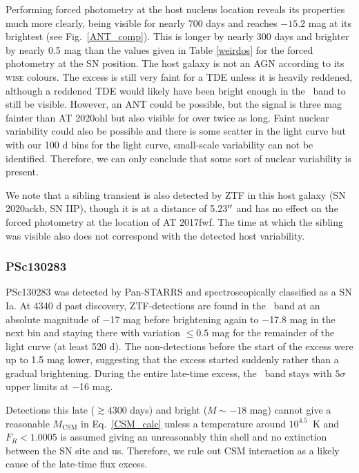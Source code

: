 \documentclass[a4paper,oneside,12pt, class=Latex/Classes/PhDthesisPSnPDF, crop=false]{standalone}
\begin{document}
Performing forced photometry at the host nucleus location reveals its properties much more clearly, being visible for nearly 700 days and reaches $-15.2$ mag at its brightest (see Fig.~\ref{ANT_comp}). This is longer by nearly 300 days and brighter by nearly 0.5 mag than the values given in Table \ref{weirdos} for the forced photometry at the SN position. The host galaxy is not an AGN according to its \textsc{wise} colours. The excess is still very faint for a TDE unless it is heavily reddened, although a reddened TDE would likely have been bright enough in the \ztfi\ band to still be visible. However, an ANT could be possible, but the signal is three mag fainter than AT 2020ohl but also visible for over twice as long. Faint nuclear variability could also be possible and there is some scatter in the light curve but with our 100 d bins for the light curve, small-scale variability can not be identified. Therefore, we can only conclude that some sort of nuclear variability is present. 

We note that a sibling transient is also detected by ZTF in this host galaxy (SN 2020ackb, SN IIP), though it is at a distance of 5.23$^{\prime\prime}$ and has no effect on the forced photometry at the location of AT 2017fwf. The time at which the sibling was visible also does not correspond with the detected host variability.


\subsubsection*{PSc130283}
PSc130283 was detected by Pan-STARRS and spectroscopically classified as a SN Ia. At 4340 d past discovery, ZTF-detections are found in the \ztfr\ band at an absolute magnitude of $-$17 mag before brightening again to $-$17.8 mag in the next bin and staying there with variation $\leq 0.5$ mag for the remainder of the light curve (at least 520 d). The non-detections before the start of the excess were up to 1.5 mag lower, suggesting that the excess started suddenly rather than a gradual brightening. During the entire late-time excess, the \ztfg\ band stays with $5\sigma$ upper limits at $-$16 mag.

Detections this late ($\gtrsim 4300$ days) and bright ($M \sim -18$ mag) cannot give a reasonable $M_\text{CSM}$ in Eq.~\ref{CSM_calc} unless a temperature around $10^{4.5}$~K and $F_R < 1.0005$ is assumed giving an unreasonably thin shell and no extinction between the SN site and us. Therefore, we rule out CSM interaction as a likely cause of the late-time flux excess.
\end{document}
